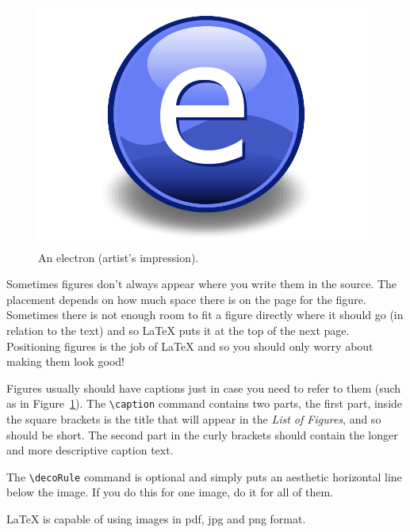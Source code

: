 \begin{figure}[th]
\centering
\includegraphics{Figures/Electron}
\decoRule
\caption[An Electron]{An electron (artist's impression).}
\label{fig:Electron}
\end{figure}

Sometimes figures don't always appear where you write them in the source. The placement depends on how much space there is on the page for the figure. Sometimes there is not enough room to fit a figure directly where it should go (in relation to the text) and so \LaTeX{} puts it at the top of the next page. Positioning figures is the job of \LaTeX{} and so you should only worry about making them look good!

Figures usually should have captions just in case you need to refer to them (such as in Figure~\ref{fig:Electron}). The \verb|\caption| command contains two parts, the first part, inside the square brackets is the title that will appear in the \emph{List of Figures}, and so should be short. The second part in the curly brackets should contain the longer and more descriptive caption text.

The \verb|\decoRule| command is optional and simply puts an aesthetic horizontal line below the image. If you do this for one image, do it for all of them.

\LaTeX{} is capable of using images in pdf, jpg and png format.

